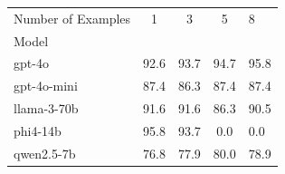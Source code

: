 \begin{table}
\label{tab:batch_5.0_stats}
\begin{tabular}{lccc}
\toprule
Number of Examples & 1 & 3 & 5 & 8 \\
Model &  &  &  &  \\
\midrule
gpt-4o & 92.6 & 93.7 & 94.7 & 95.8 \\
gpt-4o-mini & 87.4 & 86.3 & 87.4 & 87.4 \\
llama-3-70b & 91.6 & 91.6 & 86.3 & 90.5 \\
phi4-14b & 95.8 & 93.7 & 0.0 & 0.0 \\
qwen2.5-7b & 76.8 & 77.9 & 80.0 & 78.9 \\
\bottomrule
\end{tabular}
\end{table}
